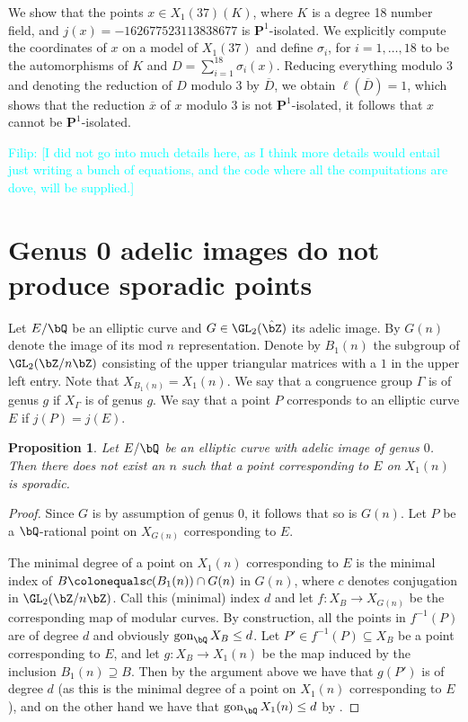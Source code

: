 \documentclass[11pt,reqno]{amsart}
\theoremstyle{plain}
\newtheorem{proposition}[theorem]{Proposition}
\theoremstyle{definition}
\DeclareMathOperator{\gon}{gon}
\newcommand{\Q}{\bQ}
\newcommand{\Z}{\bZ}
\newcommand{\PP}{\mathbf P}
\newcommand{\filip}[1]{{\textcolor{cyan}{Filip: [#1]}}}
\begin{document}
We show that the points $x\in X_1(37)(K)$, where $K$ is a degree 18 number field, and $j(x)=-162677523113838677$ is $\PP^1$-isolated. We explicitly compute the coordinates of $x$ on a model of $X_1(37)$ and define  $\sigma_i$, for $i=1,\ldots, 18$ to be the automorphisms of $K$ and $D=\sum_{i=1}^{18}\sigma_i(x)$. Reducing everything modulo $3$ and denoting the reduction of $D$ modulo $3$ by $\overline{D}$, we obtain $\ell(\overline{D})=1$, which shows that the reduction 
$\overline{x}$ of $x$ modulo 3 is not $\PP^1$-isolated, it follows that $x$ cannot be $\PP^1$-isolated.  

\filip{I did not go into much details here, as I think more details would entail just writing a bunch of equations, and the code where all the compuitations are dove, will be supplied.}

\section{Genus 0 adelic images do not produce sporadic points}

Let $E/\Q$ be an elliptic curve and $G\in \GL_2(\hat \Z)$ its adelic image. By $G(n)$ denote the image of its mod $n$ representation. Denote by $B_1(n)$ the subgroup of $\GL_2(\Z/n\Z)$ consisting of the upper triangular matrices with a $1$ in the upper left entry. Note that $X_{B_1(n)}=X_1(n)$. We say that a congruence group $\Gamma$ is of genus $g$ if $X_\Gamma$ is of genus $g$. We say that a point $P$ corresponds to an elliptic curve $E$ if $j(P)=j(E)$.

\begin{proposition}
Let $E/\Q$ be an elliptic curve with adelic image of genus $0$. Then there does not exist an $n$ such that a point corresponding to $E$ on $X_1(n)$ is sporadic.
\end{proposition}
\begin{proof}
Since $G$ is by assumption of genus $0$, it follows that so is $G(n)$. Let $P$ be a $\Q$-rational point on $X_{G(n)}$ corresponding to $E$.


The minimal degree of a point on $X_1(n)$ corresponding to $E$ is the minimal index of $B \colonequals c(B_1(n))\cap G(n)$ in $G(n)$, where $c$ denotes conjugation in $\GL_2(\Z /n \Z)$.
Call this (minimal) index $d$ and let $f\colon X_{B}\rightarrow X_{G(n)}$ be the corresponding map of modular curves. By construction, all the points in $f^{-1}(P)$ are of degree $d$ and obviously $\gon_\Q X_{B}\leq d$. Let $P'\in f^{-1}(P) \subseteq X_{B}$ be a point corresponding to $E$, and let $g\colon X_{B}\rightarrow X_1(n)$ be the map induced by the inclusion $B_1(n) \supseteq B$. Then by the argument above we have that $g(P')$ is of degree $d$ (as this is the minimal degree of a point on $X_1(n)$ corresponding to $E$), and on the other hand we have that $\gon_\Q X_1(n)\leq d$ by \cite[Proposition~A.1\,(vii)]{Poonen:gonality}.
\end{proof}
\end{document}
